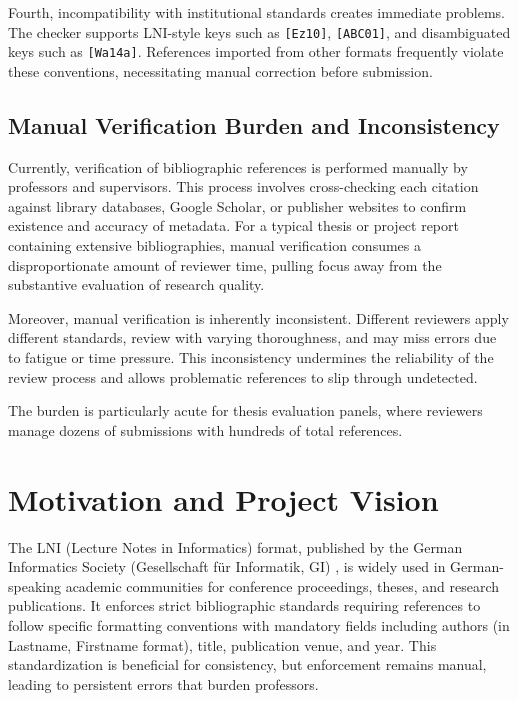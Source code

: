\documentclass[12pt,a4paper,oneside]{report}
\begin{document}
    Fourth, incompatibility with institutional standards creates immediate problems. The checker supports LNI-style keys such as \texttt{[Ez10]}, \texttt{[ABC01]}, and disambiguated keys such as \texttt{[Wa14a]}. References imported from other formats frequently violate these conventions, necessitating manual correction before submission.

\subsection{Manual Verification Burden and Inconsistency}

Currently, verification of bibliographic references is performed manually by professors and supervisors. This process involves cross-checking each citation against library databases, Google Scholar, or publisher websites to confirm existence and accuracy of metadata. For a typical thesis or project report containing extensive bibliographies, manual verification consumes a disproportionate amount of reviewer time, pulling focus away from the substantive evaluation of research quality.

Moreover, manual verification is inherently inconsistent. Different reviewers apply different standards, review with varying thoroughness, and may miss errors due to fatigue or time pressure. This inconsistency undermines the reliability of the review process and allows problematic references to slip through undetected.

The burden is particularly acute for thesis evaluation panels, where reviewers manage dozens of submissions with hundreds of total references. 

\section{Motivation and Project Vision}

The LNI (Lecture Notes in Informatics) format, published by the German Informatics Society (Gesellschaft für Informatik, GI) \cite{gi2026}, is widely used in German-speaking academic communities for conference proceedings, theses, and research publications. It enforces strict bibliographic standards requiring references to follow specific formatting conventions with mandatory fields including authors (in Lastname, Firstname format), title, publication venue, and year. This standardization is beneficial for consistency, but enforcement remains manual, leading to persistent errors that burden professors.
\end{document}

